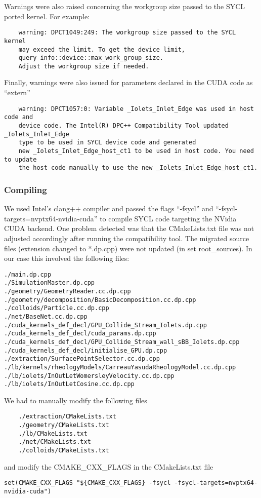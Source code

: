 \documentclass[../main]{subfiles}
\begin{document}
Warnings were also raised concerning the workgroup size passed to the SYCL ported kernel.
For example:
\begin{verbatim}
    warning: DPCT1049:249: The workgroup size passed to the SYCL kernel
    may exceed the limit. To get the device limit,
    query info::device::max_work_group_size.
    Adjust the workgroup size if needed.
\end{verbatim}

Finally, warnings were also issued for parameters declared in the CUDA code as ``extern''
\begin{verbatim}
    warning: DPCT1057:0: Variable _Iolets_Inlet_Edge was used in host code and
    device code. The Intel(R) DPC++ Compatibility Tool updated _Iolets_Inlet_Edge
    type to be used in SYCL device code and generated
    new _Iolets_Inlet_Edge_host_ct1 to be used in host code. You need to update
    the host code manually to use the new _Iolets_Inlet_Edge_host_ct1.
\end{verbatim}

\subsubsection{Compiling}
We used Intel’s clang++ compiler and passed the flags ``-fsycl'' and ``-fsycl-targets=nvptx64-nvidia-cuda'' to compile SYCL code targeting the NVidia CUDA backend.
One problem detected was that the CMakeLists.txt file was not adjusted accordingly after running the  compatibility tool.
The migrated source files (extension changed to *.dp.cpp) were not updated (in set root\_sources).
In our case this involved the following files:
\begin{verbatim}
./main.dp.cpp
./SimulationMaster.dp.cpp
./geometry/GeometryReader.cc.dp.cpp
./geometry/decomposition/BasicDecomposition.cc.dp.cpp
./colloids/Particle.cc.dp.cpp
./net/BaseNet.cc.dp.cpp
./cuda_kernels_def_decl/GPU_Collide_Stream_Iolets.dp.cpp
./cuda_kernels_def_decl/cuda_params.dp.cpp
./cuda_kernels_def_decl/GPU_Collide_Stream_wall_sBB_Iolets.dp.cpp
./cuda_kernels_def_decl/initialise_GPU.dp.cpp
./extraction/SurfacePointSelector.cc.dp.cpp
./lb/kernels/rheologyModels/CarreauYasudaRheologyModel.cc.dp.cpp
./lb/iolets/InOutLetWomersleyVelocity.cc.dp.cpp
./lb/iolets/InOutLetCosine.cc.dp.cpp
\end{verbatim}

We had to manually modify the following files
\begin{verbatim}
    ./extraction/CMakeLists.txt
    ./geometry/CMakeLists.txt
    ./lb/CMakeLists.txt
    ./net/CMakeLists.txt
    ./colloids/CMakeLists.txt
\end{verbatim}
and modify the CMAKE\_CXX\_FLAGS in the CMakeLists.txt file
\begin{verbatim}
set(CMAKE_CXX_FLAGS "${CMAKE_CXX_FLAGS} -fsycl -fsycl-targets=nvptx64-nvidia-cuda")
\end{verbatim}
\end{document}
